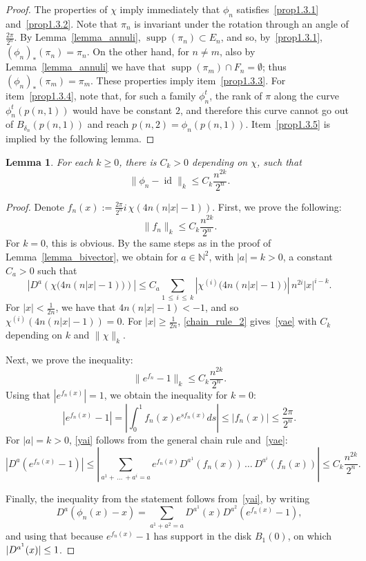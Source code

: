 \documentclass[10pt]{amsart}
\newtheorem{lemm}[cdrthm]{Lemma}
\theoremstyle{definition}
\newcommand{\N}{\mathbb{N}}
\newcommand{\norm}[1]{\|#1\|}
\DeclareMathOperator{\id}{id}
\DeclareMathOperator{\supp}{supp}
\begin{document}
\begin{proof}
The properties of $\chi$ imply immediately that $\phi_n$ satisfies~\eqref{prop1.3.1} and~\eqref{prop1.3.2}. Note that $\pi_n$ is invariant under the rotation through an angle of $\frac{2\pi}{2^n}$. By Lemma~\ref{lemma_annuli}, $\supp(\pi_n)\subset E_n$, and so, by~\eqref{prop1.3.1}, $(\phi_n)_*(\pi_n)=\pi_n$. On the other hand, for $n\neq m$, also by Lemma~\ref{lemma_annuli} we have that $\supp({\pi}_m)\cap F_n=\emptyset$; thus $(\phi_n)_*(\pi_m)=\pi_m$. These properties imply item~\eqref{prop1.3.3}. For item~\eqref{prop1.3.4}, note that, for such a family $\phi_n^t$, the rank of $\pi$ along the curve $\phi_n^t(p(n,1))$ would have be constant $2$, and therefore this curve cannot go out of $B_{\delta_n}(p(n,1))$ and reach $p(n,2)=\phi_n(p(n,1))$. Item~\eqref{prop1.3.5} is implied by the following lemma.
\end{proof}

\begin{lemm}\label{lemma_inequality}
For each $k\geq 0$, there is $C_k>0$ depending on $\chi$, such that
\[
\norm{\phi_{n}-\id}_{k}\leq C_k \frac{n^{2k}}{2^n}.
\]
\end{lemm}


\begin{proof}
Denote $f_n(x):=\frac{2\pi}{2^n}i\, \chi(4n(n|x|-1))$. First, we prove the following:
\begin{equation}\label{yae}
\norm{f_n}_k\leq C_k\frac{n^{2k}}{2^n}.
\end{equation}
For $k=0$, this is obvious. By the same steps as in the proof of Lemma~\ref{lemma_bivector}, we obtain for $a\in \N^2$, with $|a|=k>0$, a constant $C_a>0$ such that
\begin{equation}\label{chain_rule_2}
\left|D^a\left(\chi\big(4n(n|x|-1)\big)\right)\right|\leq C_a\sum_{1\,\leq\,i\,\leq\,k}\left|\chi^{(i)}\big(4n(n|x|-1)\big)\right|\, n^{2i} |x|^{i-k}.
\end{equation}
For $|x|<\frac{1}{2n}$, we have that $4n(n|x|-1)<-1$, and so $\chi^{(i)}(4n(n|x|-1))=0$. For $|x|\geq \frac{1}{2n}$, \eqref{chain_rule_2} gives~\eqref{yae} with $C_k$ depending on $k$ and $\norm{\chi}_k$.

Next, we prove the inequality:
\begin{equation}\label{yai}
\norm{e^{f_n}-1}_k\leq C_k\frac{n^{2k}}{2^n}.
\end{equation}
Using that $|e^{f_n(x)}|=1$, we obtain the inequality for $k=0$:
\[
\left|e^{f_n(x)}-1\right|=\left|\int_0^1f_n(x)e^{s f_n(x)}d s\right|\leq \left|f_n(x)\right|\leq \frac{2\pi}{2^n}.
\]
For $|a|=k>0$, \eqref{yai} follows from the general chain rule and~\eqref{yae}:
\[
\left|D^a(e^{f_n(x)}-1)\right|\leq \left|\sum_{a^1+\,\ldots\,+a^i=a}e^{f_{n}(x)}D^{a^1}\left(f_n(x)\right)\,\ldots\,D^{a^i}\left(f_n(x)\right)\right|\leq C_k\frac{n^{2k}}{2^n}.
\]

Finally, the inequality from the statement follows from~\eqref{yai}, by writing
\[
D^a\left(\phi_n(x)-x\right)=\sum_{a^1+a^2=a}D^{a^1}(x)D^{a^2}\left(e^{f_n(x)}-1\right),
\]
and using that because $e^{f_n(x)}-1$ has support in the disk $B_1(0)$, on which $|D^{a^1}(x)|\linebreak\leq 1$.
\end{proof}
\end{document}
